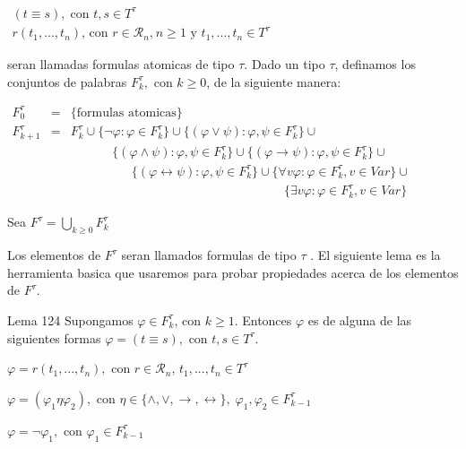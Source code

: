 \(\displaystyle \begin{array}{l} (t\equiv s),\;\text{con }t,s\in T^{\tau } \\ r(t_{1},...,t_{n})\text{, con }r\in \mathcal{R}_{n}\text{,}\ n\geq 1\text{ y }t_{1},...,t_{n}\in T^{\tau } \end{array} \)

seran llamadas formulas atomicas de tipo \(\tau \).
Dado un tipo \(\tau \), definamos los conjuntos de palabras \(F_{k}^{\tau },\) con \(k\geq 0\), de la siguiente manera:

\(\displaystyle \begin{array}{ccl} F_{0}^{\tau } & = & \{\text{formulas atomicas}\} \\ F_{k+1}^{\tau } & = & F_{k}^{\tau }\cup \{\lnot \varphi :\varphi \in F_{k}^{\tau }\}\cup \{(\varphi \vee \psi ):\varphi ,\psi \in F_{k}^{\tau }\}\cup \\ & & \ \ \ \ \ \ \ \ \ \ \ \ \ \ \ \{(\varphi \wedge \psi ):\varphi ,\psi \in F_{k}^{\tau }\}\cup \{(\varphi \rightarrow \psi ):\varphi ,\psi \in F_{k}^{\tau }\}\cup \\ & & \ \ \ \ \ \ \ \ \ \ \ \ \ \ \ \ \ \ \ \ \ \ \{(\varphi \leftrightarrow \psi ):\varphi ,\psi \in F_{k}^{\tau }\}\cup \{\forall v\varphi :\varphi \in F_{k}^{\tau },v\in Var\}\cup \\ & & \ \ \ \ \ \ \ \ \ \ \ \ \ \ \ \ \ \ \ \ \ \ \ \ \ \ \ \ \ \ \ \ \ \ \ \ \ \ \ \ \ \ \ \ \ \ \ \ \ \ \ \ \ \ \ \ \ \ \ \ \ \ \ \ \ \ \ \ \ \ \ \ \ \ \ \ \ \{\exists v\varphi :\varphi \in F_{k}^{\tau },v\in Var\} \end{array} \)

Sea
\(\displaystyle F^{\tau }=\bigcup_{k\geq 0}F_{k}^{\tau } \)

Los elementos de \(F^{\tau }\) seran llamados formulas de tipo \(\tau \) . El siguiente lema es la herramienta basica que usaremos para probar propiedades acerca de los elementos de \(F^{\tau }\).

Lema 124 Supongamos \(\varphi \in F_{k}^{\tau }\), con \(k\geq 1\). Entonces \(\varphi \) es de alguna de las siguientes formas
\(\varphi =(t\equiv s),\) con \(t,s\in T^{\tau }\).

\(\varphi =r(t_{1},...,t_{n}),\) con \(r\in \mathcal{R}_{n}\), \( t_{1},...,t_{n}\in T^{\tau }\)

\(\varphi =(\varphi _{1}\eta \varphi _{2}),\) con \(\eta \in \{\wedge ,\vee ,\rightarrow ,\leftrightarrow \},\;\varphi _{1},\varphi _{2}\in F_{k-1}^{\tau }\)

\(\varphi =\lnot \varphi _{1},\) con \(\varphi _{1}\in F_{k-1}^{\tau }\)

